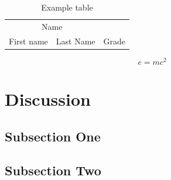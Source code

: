 \documentclass[a4paper,12pt]{article}
\begin{document}
\begin{table}[H]
\caption{Example table}
\centering
\begin{tabular}{llr}
\toprule
\multicolumn{2}{c}{Name} \\
\cmidrule(r){1-2}
First name & Last Name & Grade \\
\midrule
\bottomrule
\end{tabular}
\end{table}


\begin{equation}
\label{eq:emc}
e = mc^2
\end{equation}



\section{Discussion}

\subsection{Subsection One}


\subsection{Subsection Two}


%
{}






\end{document}
